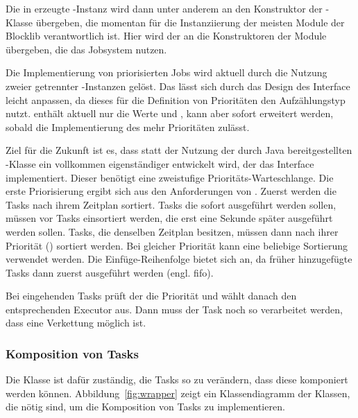 Die in \classGame{} erzeugte \classBlocklibExecutor{}-Instanz wird dann unter anderem an den Konstruktor der \classContext{}-Klasse übergeben, die momentan für die Instanziierung der meisten Module der Blocklib verantwortlich ist. Hier wird der \classBlocklibExecutor{} an die Konstruktoren der Module übergeben, die das Jobsystem nutzen.

Die Implementierung von priorisierten Jobs wird aktuell durch die Nutzung zweier getrennter \classExecutor{}-Instanzen gelöst. Das lässt sich durch das Design des Interface \classBlocklibExecutorService{} leicht anpassen, da dieses für die Definition von Prioritäten den Aufzählungstyp \classTaskPriority{} nutzt. \classTaskPriority{} enthält aktuell nur die Werte  und , kann aber sofort erweitert werden, sobald die Implementierung des \classBlocklibExecutorService{} mehr Prioritäten zulässt. 

Ziel für die Zukunft ist es, dass statt der Nutzung der durch Java bereitgestellten \classScheduledThreadPoolExecutor{}-Klasse ein vollkommen eigenständiger \classExecutorService{} entwickelt wird, der das Interface \classBlocklibExecutorService{} implementiert. Dieser benötigt eine zweistufige Prioritäts-Warteschlange. Die erste Priorisierung ergibt sich aus den Anforderungen von \classScheduledExecutorService{}. Zuerst werden die Tasks nach ihrem Zeitplan sortiert. Tasks die sofort ausgeführt werden sollen, müssen vor Tasks einsortiert werden, die erst eine Sekunde später ausgeführt werden sollen. Tasks, die denselben Zeitplan besitzen, müssen dann nach ihrer Priorität (\classTaskPriority{}) sortiert werden. Bei gleicher Priorität kann eine beliebige Sortierung verwendet werden. Die Einfüge-Reihenfolge bietet sich an, da früher hinzugefügte Tasks dann zuerst ausgeführt werden (engl. \ac{fifo}).

Bei eingehenden Tasks prüft der \classBlocklibExecutor{} die Priorität und wählt danach den entsprechenden Executor aus. Dann muss der Task noch so verarbeitet werden, dass eine Verkettung möglich ist.

\subsubsection{Komposition von Tasks}\label{sec:Verkettung}
Die Klasse \classCompletableFutureWrapper{} ist dafür zuständig, die Tasks so zu verändern, dass diese komponiert werden können. Abbildung~\ref{fig:wrapper} zeigt ein Klassendiagramm der Klassen, die nötig sind, um die Komposition von Tasks zu implementieren. 

